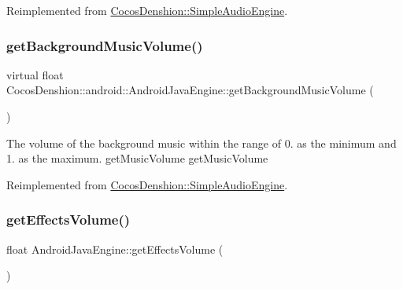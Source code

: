 Reimplemented from \hyperlink{classCocosDenshion_1_1SimpleAudioEngine_a393d453216f76884e92cf010ba926330}{Cocos\+Denshion\+::\+Simple\+Audio\+Engine}.

\mbox{\label{classCocosDenshion_1_1android_1_1AndroidJavaEngine_ae645138af1efe4007a90acd55fa55233}} 
\subsubsection{\texorpdfstring{get\+Background\+Music\+Volume()}{getBackgroundMusicVolume()}\hspace{0.1cm}{\footnotesize\ttfamily [2/2]}}
{\footnotesize\ttfamily virtual float Cocos\+Denshion\+::android\+::\+Android\+Java\+Engine\+::get\+Background\+Music\+Volume (\begin{DoxyParamCaption}{ }\end{DoxyParamCaption})\hspace{0.3cm}{\ttfamily [virtual]}}

The volume of the background music within the range of 0. as the minimum and 1. as the maximum.  get\+Music\+Volume  get\+Music\+Volume 

Reimplemented from \hyperlink{classCocosDenshion_1_1SimpleAudioEngine_a393d453216f76884e92cf010ba926330}{Cocos\+Denshion\+::\+Simple\+Audio\+Engine}.

\mbox{\label{classCocosDenshion_1_1android_1_1AndroidJavaEngine_a21e1cc7de8f050587bbcf35e46add189}} 
\subsubsection{\texorpdfstring{get\+Effects\+Volume()}{getEffectsVolume()}\hspace{0.1cm}{\footnotesize\ttfamily [1/2]}}
{\footnotesize\ttfamily float Android\+Java\+Engine\+::get\+Effects\+Volume (\begin{DoxyParamCaption}{ }\end{DoxyParamCaption})\hspace{0.3cm}{\ttfamily [virtual]}}

